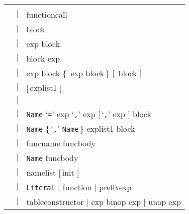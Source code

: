 \documentclass[11pt,twoside]{article}
\newcommand{\C}[1]{}
\renewcommand{\Or}{$|$ }
\renewcommand{\rep}[1]{{\rm\{}\,#1\,{\rm\}}}
\renewcommand{\opt}[1]{{\rm [}\,#1\,{\,\rm]}}
\renewcommand{\ter}[1]{{\rm`{\tt#1}'}}
\newcommand{\Nter}[1]{{\tt#1}}
\begin{document}
\renewenvironment{Produc}{\vspace{0.8ex}\par\noindent\hspace{3ex}\it\begin{tabular}{rrl}}{\end{tabular}\vspace{0.8ex}\par\noindent}

\renewcommand{\OrNL}{\\ & \Or & }
\C{\newcommand{\Nter}[1]{{\rm{\tt#1}}}}
\C{\newcommand{\Nter}[1]{\ter{#1}}}


\begin{Produc}

\produc{chunk}{\rep{stat \opt{\ter{;}}}}

\produc{block}{chunk}

\produc{stat}{
	varlist1 \ter{=} explist1
\OrNL	functioncall
\OrNL	\rwd{do} block \rwd{end}
\OrNL	\rwd{while} exp \rwd{do} block \rwd{end}
\OrNL	\rwd{repeat} block \rwd{until} exp
\OrNL	\rwd{if} exp \rwd{then} block
	\rep{\rwd{elseif} exp \rwd{then} block}
	\opt{\rwd{else} block} \rwd{end}
\OrNL	\rwd{return} \opt{explist1}
\OrNL	\rwd{break}
\OrNL	\rwd{for} \Nter{Name} \ter{=} exp \ter{,} exp \opt{\ter{,} exp}
	\rwd{do} block \rwd{end}
\OrNL   \rwd{for} \Nter{Name} \rep{\ter{,} \Nter{Name}} \rwd{in} explist1
                    \rwd{do} block \rwd{end}
\OrNL	\rwd{function} funcname funcbody
\OrNL	\rwd{local} \rwd{function} \Nter{Name} funcbody
\OrNL	\rwd{local} namelist \opt{init}
}

\produc{funcname}{\Nter{Name} \rep{\ter{.} \Nter{Name}}
                              \opt{\ter{:} \Nter{Name}}}

\produc{varlist1}{var \rep{\ter{,} var}}

\produc{var}{
	\Nter{Name}
\Or	prefixexp \ter{[} exp \ter{]}
\Or	prefixexp \ter{.} \Nter{Name}
}

\produc{namelist}{\Nter{Name} \rep{\ter{,} \Nter{Name}}}

\produc{init}{\ter{=} explist1}

\produc{explist1}{\rep{exp \ter{,}} exp}

\produc{exp}{
	\rwd{nil}
	\rwd{false}
	\rwd{true}
\Or	\Nter{Number}
\OrNL	\Nter{Literal}
\Or	function
\Or	prefixexp
\OrNL	tableconstructor
\Or	exp binop exp
\Or	unop exp
}

\produc{prefixexp}{var \Or functioncall \Or \ter{(} exp \ter{)}}


\end{Produc}
\end{document}
